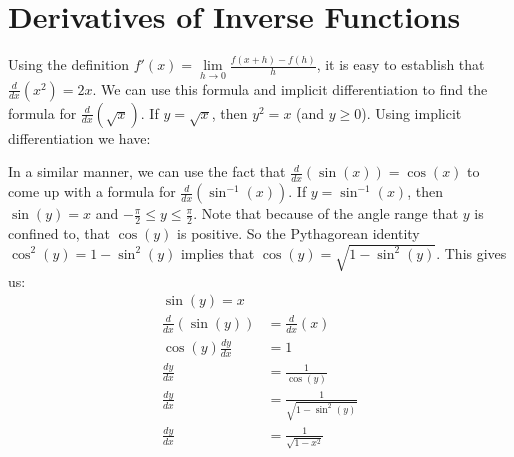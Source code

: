 \documentclass[10pt,oneside,]{book}
\theoremstyle{plain}
\theoremstyle{definition}
\numberwithin{equation}{section}
\newcounter{figstack}
\newcounter{figindex}
\newlength\fight
\newcommand\pushValignCaptionBottom[5][b]{%
\stepcounter{figstack}%
\expandafter\def\csname %
figalign\romannumeral\value{figstack}\endcsname{#1}%
\expandafter\def\csname %
figtype\romannumeral\value{figstack}\endcsname{#2}%
\expandafter\def\csname %
figwd\romannumeral\value{figstack}\endcsname{#3}%
\expandafter\def\csname %
figcontent\romannumeral\value{figstack}\endcsname{#4}%
\expandafter\def\csname %
figcap\romannumeral\value{figstack}\endcsname{#5}%
\setbox0=\hbox{%
\begin{#2}{#3}#4\end{#2}}%
\ifdim\dimexpr\ht0+\dp0\relax>\fight\global\setlength{\fight}{%
\dimexpr\ht0+\dp0\relax}\fi%
}
\newcommand\popValignCaptionBottom{%
\setcounter{figindex}{0}%
\hfill%
\whiledo{\value{figindex}<\value{figstack}}{%
\stepcounter{figindex}%
\def\tmp{\csname figwd\romannumeral\value{figindex}\endcsname}%
\begin{\csname figtype\romannumeral\value{figindex}\endcsname}[t]{\tmp}%
\centering%
\stackinset{c}{}%
{\csname figalign\romannumeral\value{figindex}\endcsname}{}%
{\csname figcontent\romannumeral\value{figindex}\endcsname}%
{\rule{0pt}{\fight}}\par%
\csname figcap\romannumeral\value{figindex}\endcsname%
\end{\csname figtype\romannumeral\value{figindex}\endcsname}%
\hfill%
}%
\setcounter{figstack}{0}%
\setlength{\fight}{0pt}%
\hfill%
}
\newcommand{\fe}[2]{#1\mathopen{}\left(#2\right)\mathclose{}}
\newcommand{\fd}[1]{#1'}
\newcommand{\lz}[2]{\frac{d#1}{d#2}}
\newcommand{\lzoo}[2]{{\frac{d}{d#1}}{\left(#2\right)}}
\begin{document}
\section[Derivatives of Inverse Functions]{Derivatives of Inverse Functions}\label{section-derivatives-of-inverse-functions}
Using the definition \(\fe{\fd{f}}{x}=\lim\limits_{h\to0}\frac{\fe{f}{x+h}-\fe{f}{h}}{h}\), it is easy to establish that \(\lzoo{x}{x^2}=2x\). We can use this formula and implicit differentiation to find the formula for \(\lzoo{x}{\sqrt{x}}\).  If \(y=\sqrt{x}\), then \(y^2=x\) (and \(y\geq0\)). Using implicit differentiation we have:%
\par
In a similar manner, we can use the fact that \(\lzoo{x}{\fe{\sin}{x}}=\fe{\cos}{x}\) to come up with a formula for \(\lzoo{x}{\fe{\sin^{-1}}{x}}\). If \(y=\fe{\sin^{-1}}{x}\), then \(\fe{\sin}{y}=x\) and \(-\frac{\pi}{2}\leq y\leq \frac{\pi}{2}\). Note that because of the angle range that \(y\) is confined to, that \(\fe{\cos}{y}\) is positive. So the Pythagorean identity \(\fe{\cos^2}{y}=1-\fe{\sin^2}{y}\) implies that \(\fe{\cos}{y}=\sqrt{1-\fe{\sin^2}{y}}\). This gives us:\begin{align*}
\fe{\sin}{y}=x\\
\lzoo{x}{\fe{\sin}{y}}&=\lzoo{x}{x}\\
\fe{\cos}{y}\lz{y}{x}&=1\\
\lz{y}{x}&=\frac{1}{\fe{\cos}{y}}\\
\lz{y}{x}&=\frac{1}{\sqrt{1-\fe{\sin^2}{y}}}\\
\lz{y}{x}&=\frac{1}{\sqrt{1-x^2}}
\end{align*}%
\typeout{************************************************}
\typeout{************************************************}
\end{document}
